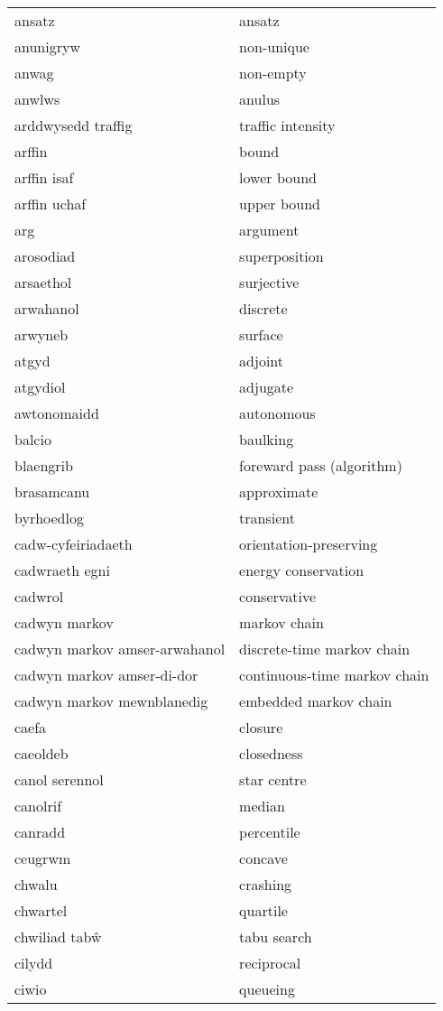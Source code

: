 \begin{supertabular}{p{0.22\textwidth}p{0.22\textwidth}}
ansatz & ansatz \\
anunigryw & non-unique \\
anwag & non-empty \\
anwlws & anulus \\
arddwysedd traffig & traffic intensity \\
arffin & bound \\
arffin isaf & lower bound \\
arffin uchaf & upper bound \\
arg & argument \\
arosodiad & superposition \\
arsaethol & surjective \\
arwahanol & discrete \\
arwyneb & surface \\
atgyd & adjoint \\
atgydiol & adjugate \\
awtonomaidd & autonomous \\
balcio & baulking \\
blaengrib & foreward pass (algorithm) \\
brasamcanu & approximate \\
byrhoedlog & transient \\
cadw-cyfeiriadaeth & orientation-preserving \\
cadwraeth egni & energy conservation \\
cadwrol & conservative \\
cadwyn markov & markov chain \\
cadwyn markov amser-arwahanol & discrete-time markov chain \\
cadwyn markov amser-di-dor & continuous-time markov chain \\
cadwyn markov mewnblanedig & embedded markov chain \\
caefa & closure \\
caeoldeb & closedness \\
canol serennol & star centre \\
canolrif & median \\
canradd & percentile \\
ceugrwm & concave \\
chwalu & crashing \\
chwartel & quartile \\
chwiliad tabŵ & tabu search \\
cilydd & reciprocal \\
ciwio & queueing \\

\end{supertabular}
